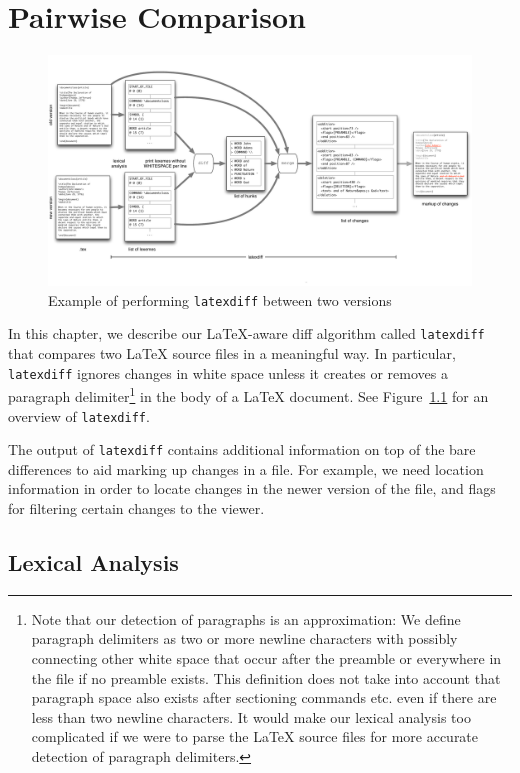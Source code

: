 \chapter{Pairwise Comparison}\label{sec:compare}
\minitoc

\begin{figure}
\centering
\includegraphics[width=\textwidth]{./figures/latexdiff3}
\caption{Example of performing \texttt{latexdiff} between two versions} \label{fig:latexdiff}
\end{figure}

In this chapter, we describe our LaTeX-aware diff algorithm called \texttt{latexdiff} that compares two LaTeX source files in a meaningful way.  In particular, \texttt{latexdiff} ignores changes in white space unless it creates or removes a paragraph delimiter\footnote{Note that our detection of paragraphs is an approximation: We define paragraph delimiters as two or more newline characters with possibly connecting other white space that occur after the preamble or everywhere in the file if no preamble exists. This definition does not take into account that paragraph space also exists after sectioning commands etc. even if there are less than two newline characters.  It would make our lexical analysis too complicated if we were to parse the LaTeX source files for more accurate detection of paragraph delimiters.} in the body of a LaTeX document. See Figure~\ref{fig:latexdiff} for an overview of \texttt{latexdiff}. 

The output of \texttt{latexdiff} contains additional information on top of the bare differences to aid marking up changes in a file.  For example, we need location information in order to locate changes in the newer version of the file, and flags for filtering certain changes to the viewer.

\section{Lexical Analysis}

